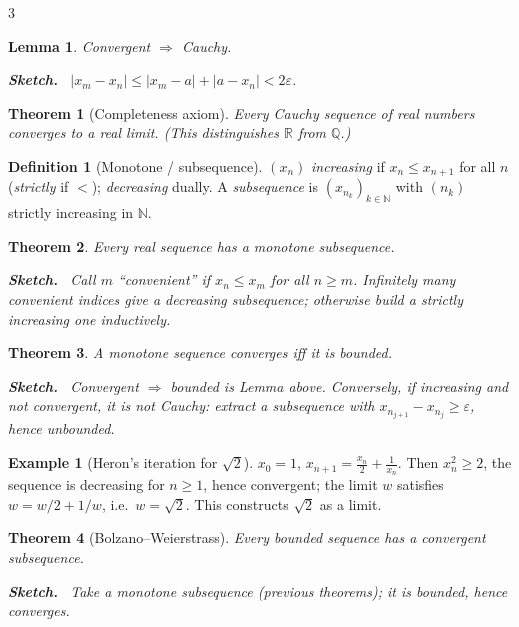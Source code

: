 \documentclass[10pt,a4paper,landscape]{article}
\theoremstyle{definition}
\newtheorem{defn}{Definition}[section]
\newtheorem{exm}{Example}[section]
\theoremstyle{plain}
\newtheorem{thm}{Theorem}[section]
\newtheorem{lem}{Lemma}[section]
\theoremstyle{remark}
\newcommand{\R}{\mathbb{R}}
\newcommand{\N}{\mathbb{N}}
\newcommand{\Q}{\mathbb{Q}}
\newcommand{\eps}{\varepsilon}
\newcommand{\abs}[1]{\lvert #1 \rvert}
\newenvironment{proofsketch}{%
  \par\small\color{exgray}\textbf{Sketch.}\ }%
  {\par}
\begin{document}
\begin{multicols*}{3}
\begin{lem}
Convergent $\Rightarrow$ Cauchy.
\begin{proofsketch}
$\abs{x_m - x_n} \le \abs{x_m - a} + \abs{a - x_n} < 2\eps$.
\end{proofsketch}
\end{lem}

\begin{thm}[Completeness axiom]
Every Cauchy sequence of real numbers converges to a real limit. (This distinguishes $\R$ from $\Q$.)
\end{thm}

\begin{defn}[Monotone / subsequence]
$(x_n)$ \emph{increasing} if $x_n \le x_{n+1}$ for all $n$ (\emph{strictly} if $<$); \emph{decreasing} dually. A \emph{subsequence} is $(x_{n_k})_{k \in \N}$ with $(n_k)$ strictly increasing in $\N$.
\end{defn}

\begin{thm}
Every real sequence has a monotone subsequence.
\begin{proofsketch}
Call $m$ ``convenient'' if $x_n \le x_m$ for all $n \ge m$. Infinitely many convenient indices give a decreasing subsequence; otherwise build a strictly increasing one inductively.
\end{proofsketch}
\end{thm}

\begin{thm}
A monotone sequence converges iff it is bounded.
\begin{proofsketch}
Convergent $\Rightarrow$ bounded is Lemma above. Conversely, if increasing and not convergent, it is not Cauchy: extract a subsequence with $x_{n_{j+1}} - x_{n_j} \ge \eps$, hence unbounded.
\end{proofsketch}
\end{thm}

\begin{exm}[Heron's iteration for $\sqrt{2}$]
$x_0 = 1$, $x_{n+1} = \frac{x_n}{2} + \frac{1}{x_n}$. Then $x_n^2 \ge 2$, the sequence is decreasing for $n \ge 1$, hence convergent; the limit $w$ satisfies $w = w/2 + 1/w$, i.e.\ $w = \sqrt{2}$. This constructs $\sqrt{2}$ as a limit.
\end{exm}

\begin{thm}[Bolzano--Weierstrass]
Every bounded sequence has a convergent subsequence.
\begin{proofsketch}
Take a monotone subsequence (previous theorems); it is bounded, hence converges.
\end{proofsketch}
\end{thm}


\end{multicols*}
\end{document}
